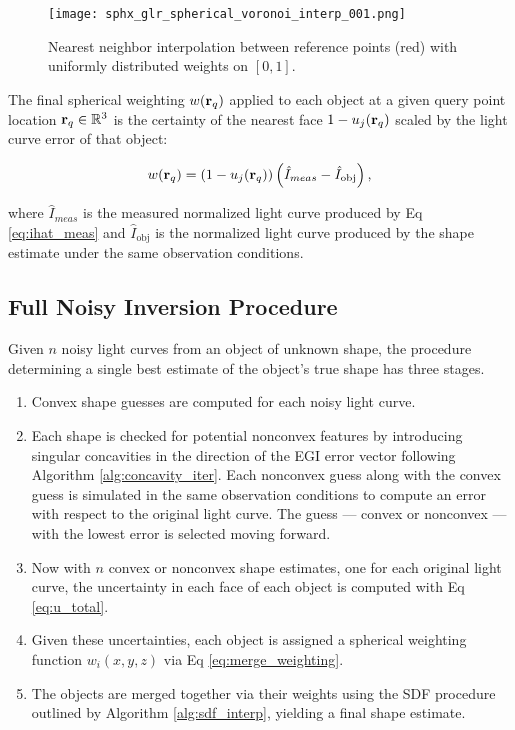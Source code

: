 \begin{figure}[!htb]
  \centering
  \texttt{[image: sphx\_glr\_spherical\_voronoi\_interp\_001.png]}
  \caption{Nearest neighbor interpolation between reference points (red) with uniformly distributed weights on $[0,1]$.}
  \label{fig:ball_tree_nn_interp}
\end{figure}

The final spherical weighting $w(\mathbf{r}_q)$ applied to each object at a given query point location $\mathbf{r}_q \in \mathbb{R}^3$ is the certainty of the nearest face $1-u_j(\mathbf{r}_q)$ scaled by the light curve error of that object:

\begin{equation} \label{eq:merge_weighting}
  w(\mathbf{r}_q) = \left( 1-u_j(\mathbf{r}_q) \right) \left( \hat{I}_{meas} - \hat{I}_\mathrm{obj} \right),
\end{equation}

where $\hat{I}_{meas}$ is the measured normalized light curve produced by Eq \ref{eq:ihat_meas} and $\hat{I}_\mathrm{obj}$ is the normalized light curve produced by the shape estimate under the same observation conditions.

\subsection{Full Noisy Inversion Procedure} \label{sec:mh_inversion}

Given $n$ noisy light curves from an object of unknown shape, the procedure determining a single best estimate of the object's true shape has three stages. 

\begin{enumerate}
  \item Convex shape guesses are computed for each noisy light curve.
  \item Each shape is checked for potential nonconvex features by introducing singular concavities in the direction of the EGI error vector following Algorithm \ref{alg:concavity_iter}. Each nonconvex guess along with the convex guess is simulated in the same observation conditions to compute an error with respect to the original light curve. The guess --- convex or nonconvex --- with the lowest error is selected moving forward.
  \item Now with $n$ convex or nonconvex shape estimates, one for each original light curve, the uncertainty in each face of each object is computed with Eq \ref{eq:u_total}.
  \item Given these uncertainties, each object is assigned a spherical weighting function $w_i(x, y, z)$ via Eq \ref{eq:merge_weighting}.
  \item The objects are merged together via their weights using the SDF procedure outlined by Algorithm \ref{alg:sdf_interp}, yielding a final shape estimate.
\end{enumerate}

